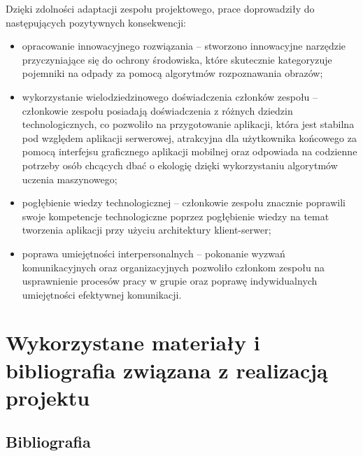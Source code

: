\documentclass[12pt, a4paper, twoside, openany]{book}
\newcommand{\forceindent}{\leavevmode{\parindent=1.3em\indent}}
\begin{document}
{\forceindent Dzięki zdolności adaptacji zespołu projektowego, prace doprowadziły do następujących pozytywnych konsekwencji:

\begin{itemize}[label=--]
    \item opracowanie innowacyjnego rozwiązania -- stworzono innowacyjne narzędzie przyczyniające się do ochrony środowiska, które skutecznie kategoryzuje pojemniki na odpady za pomocą algorytmów rozpoznawania obrazów;
    \item wykorzystanie wielodziedzinowego doświadczenia członków zespołu -- członkowie zespołu posiadają doświadczenia z różnych dziedzin technologicznych, co pozwoliło na przygotowanie aplikacji, która jest stabilna pod względem aplikacji serwerowej, atrakcyjna dla użytkownika końcowego za pomocą interfejsu graficznego aplikacji mobilnej oraz odpowiada na codzienne potrzeby osób chcących dbać o ekologię dzięki wykorzystaniu algorytmów uczenia maszynowego;
    \item pogłębienie wiedzy technologicznej -- członkowie zespołu znacznie poprawili swoje kompetencje technologiczne poprzez pogłębienie wiedzy na temat tworzenia aplikacji przy użyciu architektury klient-serwer;
    \item poprawa umiejętności interpersonalnych -- pokonanie wyzwań komunikacyjnych oraz organizacyjnych pozwoliło członkom zespołu na usprawnienie procesów pracy w grupie oraz poprawę indywidualnych umiejętności efektywnej komunikacji.
\end{itemize}

\section{Wykorzystane materiały i bibliografia związana z realizacją projektu}

\subsection{Bibliografia}

}
\end{document}
